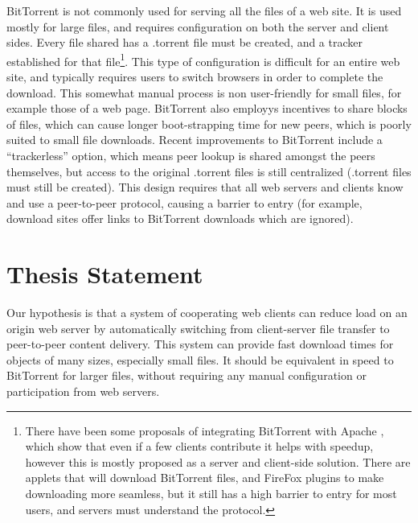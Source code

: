 
BitTorrent is not commonly used for serving all the files of a web site.  It is used mostly for large files, and requires configuration on both the server and client sides.  
Every file shared has a .torrent file must be created, and a tracker established for that file\footnote{There have been some proposals of integrating BitTorrent with Apache
 \cite{webtorrent}, which show that even if a few clients contribute it helps with speedup, however this is mostly proposed as a server and client-side solution.  
 There are applets that will download BitTorrent files, and FireFox plugins to make downloading more seamless, but it still has a high barrier to entry for most users, 
 and servers must understand the protocol.}.  This type of configuration is difficult for an entire web site, and typically requires users to switch browsers in order to complete the download.  
 This somewhat manual process is non user-friendly for small files, for example those of a web page.  BitTorrent also employys incentives to share blocks of files, which can cause longer boot-strapping 
 time for new peers, which is poorly suited to small file downloads.  Recent improvements to BitTorrent include a ``trackerless'' option, which means peer lookup is 
 shared amongst the peers themselves, but access to the original .torrent files is still centralized (.torrent files must still be created).  This design requires 
 that all web servers and clients know and use a peer-to-peer protocol, causing a barrier to entry (for example, download sites offer links to BitTorrent downloads 
 which are ignored).

\section {Thesis Statement}\label{section:thesis}
Our hypothesis is that a system of cooperating web clients can reduce load on an origin web server by automatically switching from client-server file transfer to
 peer-to-peer content delivery.  This system can provide fast download times for objects of many sizes, especially small files.  It should be equivalent in speed 
 to BitTorrent for larger files, without requiring any manual configuration or participation from web servers.

